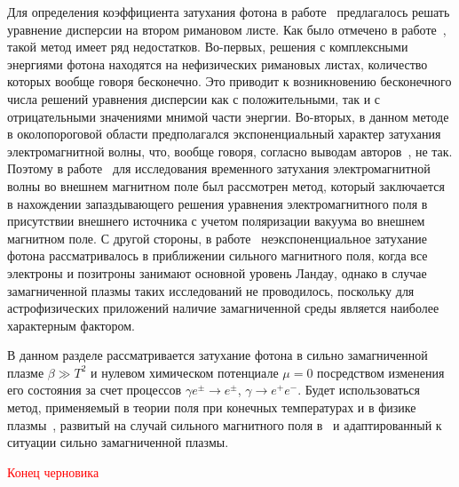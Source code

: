 Для определения коэффициента затухания фотона  в работе~\cite{Shabad:1988} предлагалось решать уравнение дисперсии на втором римановом листе.  Как было отмечено в работе~\cite{MikhChist:2001}, такой метод имеет ряд недостатков. Во-первых, решения с комплексными энергиями фотона находятся на нефизических римановых листах, количество которых вообще говоря бесконечно. Это приводит к возникновению бесконечного числа решений уравнения дисперсии как с положительными, так и с отрицательными значениями мнимой части энергии. Во-вторых, в данном методе в околопороговой области предполагался экспоненциальный характер затухания электромагнитной волны, что, вообще говоря, согласно выводам авторов~\cite{MikhChist:2001}, не так. Поэтому в работе~\cite{MikhChist:2001} для исследования временного затухания электромагнитной волны во внешнем магнитном поле был рассмотрен метод, который заключается в нахождении запаздывающего решения уравнения электромагнитного поля в присутствии внешнего источника с учетом поляризации вакуума во внешнем магнитном поле. С другой стороны, в работе~\cite{MikhChist:2001} неэкспоненциальное затухание фотона рассматривалось в приближении сильного магнитного поля, когда все электроны и позитроны занимают основной уровень Ландау, однако в случае замагниченной плазмы таких исследований не проводилось, поскольку для астрофизических приложений наличие замагниченной среды является наиболее характерным фактором.



В данном разделе рассматривается затухание фотона в сильно замагниченной плазме $\beta \gg T^2$
и нулевом химическом потенциале $\mu = 0$ посредством изменения его состояния за счет процессов $\gamma e^\pm\to e^\pm$, $\gamma \to e^+e^-$. Будет использоваться метод, применяемый в теории поля при конечных температурах и в физике плазмы~\cite{Boyan}, развитый на случай сильного магнитного поля в~\cite{MikhChist:2001} и адаптированный к ситуации сильно замагниченной плазмы.


\textcolor{red}{Конец черновика}

